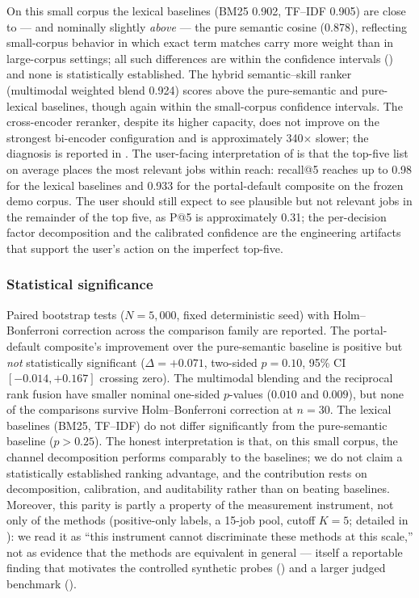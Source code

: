 On this small corpus the lexical baselines (BM25 0.902, TF--IDF 0.905) are close to --- and nominally slightly \emph{above} --- the pure semantic cosine (0.878), reflecting small-corpus behavior in which exact term matches carry more weight than in large-corpus settings; all such differences are within the confidence intervals () and none is statistically established.
The hybrid semantic--skill ranker (multimodal weighted blend 0.924) scores above the pure-semantic and pure-lexical baselines, though again within the small-corpus confidence intervals.
The cross-encoder reranker, despite its higher capacity, does not improve on the strongest bi-encoder configuration and is approximately 340$\times$ slower; the diagnosis is reported in .
The user-facing interpretation of  is that the top-five list on average places the most relevant jobs within reach: recall@5 reaches up to 0.98 for the lexical baselines and 0.933 for the portal-default composite on the frozen demo corpus.
The user should still expect to see plausible but not relevant jobs in the remainder of the top five, as P@5 is approximately 0.31; the per-decision factor decomposition and the calibrated confidence are the engineering artifacts that support the user's action on the imperfect top-five.

\subsubsection*{Statistical significance}
Paired bootstrap tests ($N = 5{,}000$, fixed deterministic seed) with Holm--Bonferroni correction across the comparison family are reported.
The portal-default composite's improvement over the pure-semantic baseline is positive but \emph{not} statistically significant ($\Delta = +0.071$, two-sided $p = 0.10$, 95\% CI $[-0.014, +0.167]$ crossing zero).
The multimodal blending and the reciprocal rank fusion have smaller nominal one-sided $p$-values ($0.010$ and $0.009$), but none of the comparisons survive Holm--Bonferroni correction at $n = 30$.
The lexical baselines (BM25, TF--IDF) do not differ significantly from the pure-semantic baseline ($p > 0.25$).
The honest interpretation is that, on this small corpus, the channel decomposition performs comparably to the baselines; we do not claim a statistically established ranking advantage, and the contribution rests on decomposition, calibration, and auditability rather than on beating baselines.
Moreover, this parity is partly a property of the measurement instrument, not only of the methods (positive-only labels, a 15-job pool, cutoff $K=5$; detailed in ): we read it as ``this instrument cannot discriminate these methods at this scale,'' not as evidence that the methods are equivalent in general --- itself a reportable finding that motivates the controlled synthetic probes () and a larger judged benchmark ().

